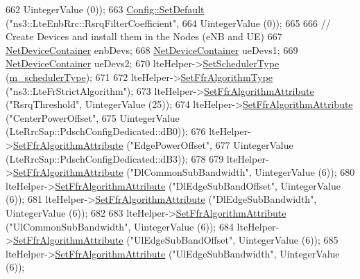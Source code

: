 \begin{DoxyCode}
662                       UintegerValue (0));
663   \hyperlink{group__config_ga2e7882df849d8ba4aaad31c934c40c06}{Config::SetDefault} (\textcolor{stringliteral}{"ns3::LteEnbRrc::RsrqFilterCoefficient"},
664                       UintegerValue (0));
665 
666   \textcolor{comment}{// Create Devices and install them in the Nodes (eNB and UE)}
667   \hyperlink{classns3_1_1NetDeviceContainer}{NetDeviceContainer} enbDevs;
668   \hyperlink{classns3_1_1NetDeviceContainer}{NetDeviceContainer} ueDevs1;
669   \hyperlink{classns3_1_1NetDeviceContainer}{NetDeviceContainer} ueDevs2;
670   lteHelper->\hyperlink{classns3_1_1LteHelper_a8f86e55b8b80a81732c4b2df00fb25d5}{SetSchedulerType} (\hyperlink{classLteFrAreaTestCase_aa093fda7c4b63732d547c87952f52f05}{m\_schedulerType});
671 
672   lteHelper->\hyperlink{classns3_1_1LteHelper_a035c6b03305c1511975362f80425b5fc}{SetFfrAlgorithmType} (\textcolor{stringliteral}{"ns3::LteFrStrictAlgorithm"});
673   lteHelper->\hyperlink{classns3_1_1LteHelper_a793d56e843a844428851e90752c5f130}{SetFfrAlgorithmAttribute} (\textcolor{stringliteral}{"RsrqThreshold"}, UintegerValue (25));
674   lteHelper->\hyperlink{classns3_1_1LteHelper_a793d56e843a844428851e90752c5f130}{SetFfrAlgorithmAttribute} (\textcolor{stringliteral}{"CenterPowerOffset"},
675                                        UintegerValue (LteRrcSap::PdschConfigDedicated::dB0));
676   lteHelper->\hyperlink{classns3_1_1LteHelper_a793d56e843a844428851e90752c5f130}{SetFfrAlgorithmAttribute} (\textcolor{stringliteral}{"EdgePowerOffset"},
677                                        UintegerValue (LteRrcSap::PdschConfigDedicated::dB3));
678 
679   lteHelper->\hyperlink{classns3_1_1LteHelper_a793d56e843a844428851e90752c5f130}{SetFfrAlgorithmAttribute} (\textcolor{stringliteral}{"DlCommonSubBandwidth"}, UintegerValue (6));
680   lteHelper->\hyperlink{classns3_1_1LteHelper_a793d56e843a844428851e90752c5f130}{SetFfrAlgorithmAttribute} (\textcolor{stringliteral}{"DlEdgeSubBandOffset"}, UintegerValue (6));
681   lteHelper->\hyperlink{classns3_1_1LteHelper_a793d56e843a844428851e90752c5f130}{SetFfrAlgorithmAttribute} (\textcolor{stringliteral}{"DlEdgeSubBandwidth"}, UintegerValue (6));
682 
683   lteHelper->\hyperlink{classns3_1_1LteHelper_a793d56e843a844428851e90752c5f130}{SetFfrAlgorithmAttribute} (\textcolor{stringliteral}{"UlCommonSubBandwidth"}, UintegerValue (6));
684   lteHelper->\hyperlink{classns3_1_1LteHelper_a793d56e843a844428851e90752c5f130}{SetFfrAlgorithmAttribute} (\textcolor{stringliteral}{"UlEdgeSubBandOffset"}, UintegerValue (6));
685   lteHelper->\hyperlink{classns3_1_1LteHelper_a793d56e843a844428851e90752c5f130}{SetFfrAlgorithmAttribute} (\textcolor{stringliteral}{"UlEdgeSubBandwidth"}, UintegerValue (6));

\end{DoxyCode}
